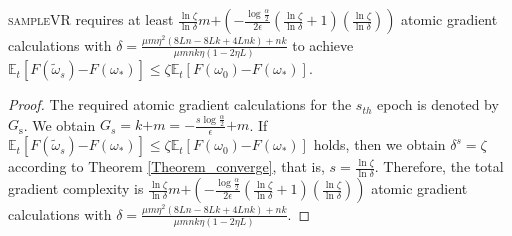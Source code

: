 \documentclass[letterpaper]{article}
\begin{document}





\begin{Theorem}
\label{theorem_gradient_complexity}
\textsc{sampleVR} requires at least  $\frac{\ln \zeta}{\ln \delta}m\mathrm{+}\left( \mathrm{-} \frac{\log\frac{\alpha}{2}}{2\epsilon} (\frac{\ln \zeta}{\ln \delta}+1)(\frac{\ln \zeta}{\ln \delta})\right)$ atomic gradient calculations with $\delta=\frac{\mu m \eta^2 (8Ln-8Lk+4Lnk)+nk}{  \mu m nk \eta (1-2\eta L)  }$ to achieve $\mathbb{E}_t[F(\tilde{\omega}_s)\mathrm{-}F(\omega_\ast)] \le \zeta \mathbb{E}_t[F(\omega_0)\mathrm{-}F(\omega_\ast)]$.
\end{Theorem}
\begin{proof}

The required atomic gradient calculations for the $s_{th}$ epoch is denoted by $G_\mathrm{s}$. We obtain
$G_s = k \mathrm{+}m = \mathrm{-} \frac{s\log\frac{\alpha}{2}}{\epsilon}\mathrm{+}m$.
If $\mathbb{E}_t[F(\tilde{\omega}_s)\mathrm{-}F(\omega_\ast)] \le \zeta \mathbb{E}_t[F(\omega_0)\mathrm{-}F(\omega_\ast)]$ holds, then we obtain $\delta^s = \zeta$ according to Theorem \ref{Theorem_converge}, that is, $s=\frac{\ln \zeta}{\ln \delta}$. Therefore, the total  gradient complexity is 
$\frac{\ln \zeta}{\ln \delta}m\mathrm{+}\left( \mathrm{-} \frac{\log\frac{\alpha}{2}}{2\epsilon} (\frac{\ln \zeta}{\ln \delta}+1)(\frac{\ln \zeta}{\ln \delta})\right)$ atomic gradient calculations with $\delta=\frac{\mu m \eta^2 (8Ln-8Lk+4Lnk)+nk}{  \mu m nk \eta (1-2\eta L)  }$. 


\end{proof}
\end{document}
